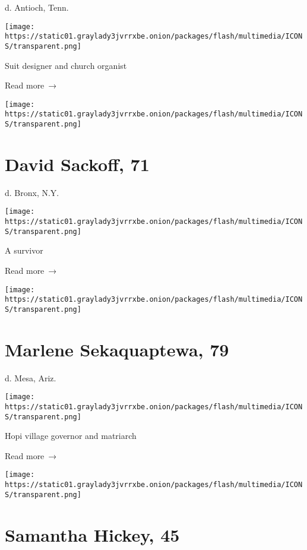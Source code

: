 d. Antioch, Tenn.

\texttt{[image: https://static01.graylady3jvrrxbe.onion/packages/flash/multimedia/ICONS/transparent.png]}

Suit designer and church organist

 Read more~→

\href{https://www.nytimes3xbfgragh.onion/2020/07/25/obituaries/david-sackoff-dead-coronavirus.html}{}

\texttt{[image: https://static01.graylady3jvrrxbe.onion/packages/flash/multimedia/ICONS/transparent.png]}

\hypertarget{david-sackoff-71}{%
\section{David Sackoff, 71}\label{david-sackoff-71}}

d. Bronx, N.Y.

\texttt{[image: https://static01.graylady3jvrrxbe.onion/packages/flash/multimedia/ICONS/transparent.png]}

A survivor

 Read more~→

\href{https://www.nytimes3xbfgragh.onion/2020/07/24/obituaries/marlene-sekaquaptewa-dead.html}{}

\texttt{[image: https://static01.graylady3jvrrxbe.onion/packages/flash/multimedia/ICONS/transparent.png]}

\hypertarget{marlene-sekaquaptewa-79}{%
\section{Marlene Sekaquaptewa, 79}\label{marlene-sekaquaptewa-79}}

d. Mesa, Ariz.

\texttt{[image: https://static01.graylady3jvrrxbe.onion/packages/flash/multimedia/ICONS/transparent.png]}

Hopi village governor and matriarch

 Read more~→

\href{https://www.nytimes3xbfgragh.onion/2020/07/23/obituaries/samantha-hickey-dead-coronavirus.html}{}

\texttt{[image: https://static01.graylady3jvrrxbe.onion/packages/flash/multimedia/ICONS/transparent.png]}

\hypertarget{samantha-hickey-45}{%
\section{Samantha Hickey, 45}\label{samantha-hickey-45}}

